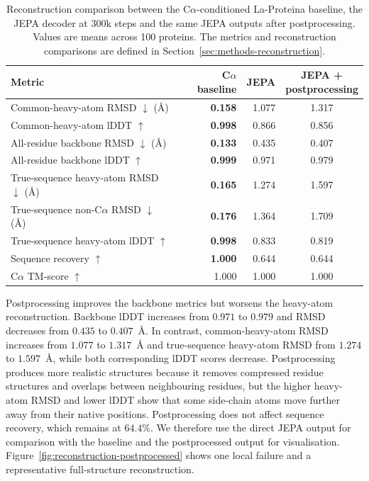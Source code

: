 \begin{table}[htbp]
\centering
\begin{tabular}{lrrc}
\toprule
Metric & C$\alpha$ baseline & JEPA & \shortstack{JEPA +\\postprocessing} \\
\midrule
Common-heavy-atom RMSD $\downarrow$ (\AA{}) & \textbf{0.158} & 1.077 & 1.317 \\
Common-heavy-atom lDDT $\uparrow$ & \textbf{0.998} & 0.866 & 0.856 \\
All-residue backbone RMSD $\downarrow$ (\AA{}) & \textbf{0.133} & 0.435 & 0.407 \\
All-residue backbone lDDT $\uparrow$ & \textbf{0.999} & 0.971 & 0.979 \\
True-sequence heavy-atom RMSD $\downarrow$ (\AA{}) & \textbf{0.165} & 1.274 & 1.597 \\
True-sequence non-C$\alpha$ RMSD $\downarrow$ (\AA{}) & \textbf{0.176} & 1.364 & 1.709 \\
True-sequence heavy-atom lDDT $\uparrow$ & \textbf{0.998} & 0.833 & 0.819 \\
Sequence recovery $\uparrow$ & \textbf{1.000} & 0.644 & 0.644 \\
C$\alpha$ TM-score $\uparrow$ & 1.000 & 1.000 & 1.000 \\
\bottomrule
\end{tabular}
\caption{Reconstruction comparison between the C$\alpha$-conditioned La-Proteina baseline, the JEPA decoder at 300k steps and the same JEPA outputs after postprocessing. Values are means across 100 proteins. The metrics and reconstruction comparisons are defined in Section~\ref{sec:methods-reconstruction}.}
\label{tab:results-reconstruction}
\end{table}

Postprocessing improves the backbone metrics but worsens the heavy-atom reconstruction. Backbone lDDT increases from $0.971$ to $0.979$ and RMSD decreases from $0.435$ to $0.407$~\AA{}. In contrast, common-heavy-atom RMSD increases from $1.077$ to $1.317$~\AA{} and true-sequence heavy-atom RMSD from $1.274$ to $1.597$~\AA{}, while both corresponding lDDT scores decrease. Postprocessing produces more realistic structures because it removes compressed residue structures and overlaps between neighbouring residues, but the higher heavy-atom RMSD and lower lDDT show that some side-chain atoms move further away from their native positions. Postprocessing does not affect sequence recovery, which remains at $64.4\%$. We therefore use the direct JEPA output for comparison with the baseline and the postprocessed output for visualisation. Figure~\ref{fig:reconstruction-postprocessed} shows one local failure and a representative full-structure reconstruction.

